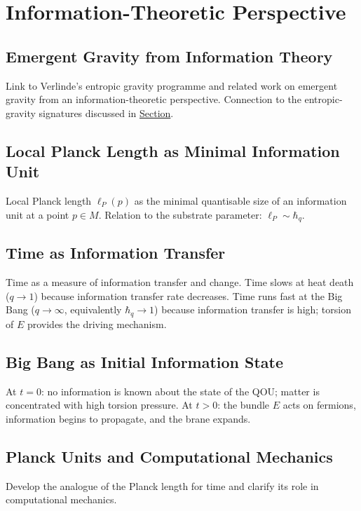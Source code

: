 \chapter{Information-Theoretic Perspective}
\label{chap:information-theory}

\section{Emergent Gravity from Information Theory}
\label{sec:emergent-gravity-info}

Link to Verlinde's entropic gravity programme and related work on emergent gravity from an information-theoretic perspective. Connection to the entropic-gravity signatures discussed in \hyperref[sec:entropic-gravity]{Section}.

\section{Local Planck Length as Minimal Information Unit}
\label{sec:planck-info-unit}

Local Planck length $\ell_P(p)$ as the minimal quantisable size of an information unit at a point $p \in M$. Relation to the substrate parameter: $\ell_P \sim \hbar_q$.

\section{Time as Information Transfer}
\label{sec:time-info}

Time as a measure of information transfer and change. Time slows at heat death ($q \to 1$) because information transfer rate decreases. Time runs fast at the Big Bang ($q \to \infty$, equivalently $\hbar_q \to 1$) because information transfer is high; torsion of $E$ provides the driving mechanism.

\section{Big Bang as Initial Information State}
\label{sec:big-bang-info}

At $t = 0$: no information is known about the state of the QOU; matter is concentrated with high torsion pressure. At $t > 0$: the bundle $E$ acts on fermions, information begins to propagate, and the brane expands.

\section{Planck Units and Computational Mechanics}
\label{sec:planck-computation}

Develop the analogue of the Planck length for time and clarify its role in computational mechanics.
